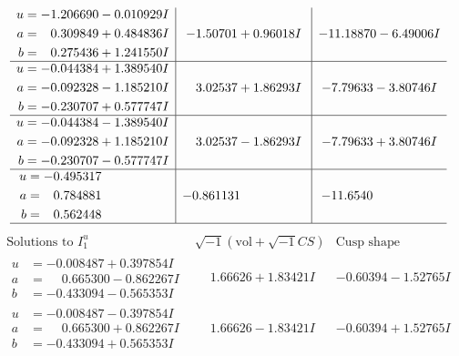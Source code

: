 \documentclass[1p]{elsarticle_modified}
\theoremstyle{definition}
\newcommand{\I}{\sqrt{-1}}
\begin{document}
$$\begin{array}{c|c|c}
\begin{aligned}
u &= -1.206690 - 0.010929 I \\
a &= \phantom{-}0.309849 + 0.484836 I \\
b &= \phantom{-}0.275436 + 1.241550 I\end{aligned}
 & -1.50701 + 0.96018 I & -11.18870 - 6.49006 I \\ \hline\begin{aligned}
u &= -0.044384 + 1.389540 I \\
a &= -0.092328 - 1.185210 I \\
b &= -0.230707 + 0.577747 I\end{aligned}
 & \phantom{-}3.02537 + 1.86293 I & -7.79633 - 3.80746 I \\ \hline\begin{aligned}
u &= -0.044384 - 1.389540 I \\
a &= -0.092328 + 1.185210 I \\
b &= -0.230707 - 0.577747 I\end{aligned}
 & \phantom{-}3.02537 - 1.86293 I & -7.79633 + 3.80746 I \\ \hline\begin{aligned}
u &= -0.495317\phantom{ +0.000000I} \\
a &= \phantom{-}0.784881\phantom{ +0.000000I} \\
b &= \phantom{-}0.562448\phantom{ +0.000000I}\end{aligned}
 & -0.861131\phantom{ +0.000000I} & -11.6540\phantom{ +0.000000I}\\
 \hline 
 \end{array}$$\newpage$$\begin{array}{c|c|c}  
\text{Solutions to }I^u_{1}& \I (\text{vol} + \sqrt{-1}CS) & \text{Cusp shape}\\
 \hline 
\begin{aligned}
u &= -0.008487 + 0.397854 I \\
a &= \phantom{-}0.665300 - 0.862267 I \\
b &= -0.433094 - 0.565353 I\end{aligned}
 & \phantom{-}1.66626 + 1.83421 I & -0.60394 - 1.52765 I \\ \hline\begin{aligned}
u &= -0.008487 - 0.397854 I \\
a &= \phantom{-}0.665300 + 0.862267 I \\
b &= -0.433094 + 0.565353 I\end{aligned}
 & \phantom{-}1.66626 - 1.83421 I & -0.60394 + 1.52765 I \\ \hline\begin{aligned}

\end{aligned}
\end{array}$$
\end{document}
